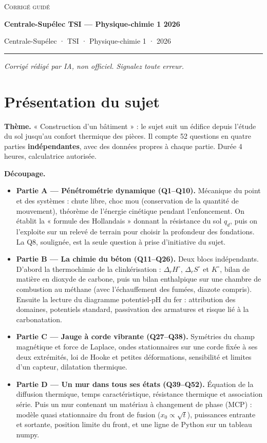 \documentclass[11pt,a4paper]{article}
\providecommand{\tightlist}{\setlength{\itemsep}{0pt}\setlength{\parskip}{0pt}}
\begin{document}
\thispagestyle{plain}
\begin{center}
  {\small\scshape Corrigé guidé}\par\smallskip
  {\LARGE\bfseries Centrale-Supélec TSI — Physique-chimie 1 2026\par}\medskip
  {\large Centrale-Supélec · TSI · Physique-chimie 1 · 2026\par}
\end{center}
\vspace{2pt}\hrule\vspace{8pt}

\emph{Corrigé rédigé par IA, non officiel. Signalez toute erreur.}

\hypertarget{pruxe9sentation-du-sujet}{%
\section{Présentation du sujet}\label{pruxe9sentation-du-sujet}}

\textbf{Thème.} « Construction d'un bâtiment » : le sujet suit un édifice depuis l'étude du sol jusqu'au confort thermique des pièces. Il compte 52 questions en quatre parties \textbf{indépendantes}, avec des données propres à chaque partie. Durée 4 heures, calculatrice autorisée.

\textbf{Découpage.}

\begin{itemize}
\tightlist
\item
  \textbf{Partie A --- Pénétrométrie dynamique (Q1--Q10).} Mécanique du point et des systèmes : chute libre, choc mou (conservation de la quantité de mouvement), théorème de l'énergie cinétique pendant l'enfoncement. On établit la « formule des Hollandais » donnant la résistance du sol \(q_d\), puis on l'exploite sur un relevé de terrain pour choisir la profondeur des fondations. La Q8, soulignée, est la seule question à prise d'initiative du sujet.
\item
  \textbf{Partie B --- La chimie du béton (Q11--Q26).} Deux blocs indépendants. D'abord la thermochimie de la clinkérisation : \(\Delta_rH^\circ\), \(\Delta_rS^\circ\) et \(K^\circ\), bilan de matière en dioxyde de carbone, puis un bilan enthalpique sur une chambre de combustion au méthane (avec l'échauffement des fumées, diazote compris). Ensuite la lecture du diagramme potentiel-pH du fer : attribution des domaines, potentiels standard, passivation des armatures et risque lié à la carbonatation.
\item
  \textbf{Partie C --- Jauge à corde vibrante (Q27--Q38).} Symétries du champ magnétique et force de Laplace, ondes stationnaires sur une corde fixée à ses deux extrémités, loi de Hooke et petites déformations, sensibilité et limites d'un capteur, dilatation thermique.
\item
  \textbf{Partie D --- Un mur dans tous ses états (Q39--Q52).} Équation de la diffusion thermique, temps caractéristique, résistance thermique et association série. Puis un mur contenant un matériau à changement de phase (MCP) : modèle quasi stationnaire du front de fusion (\(x_0 \propto \sqrt t\)), puissances entrante et sortante, position limite du front, et une ligne de Python sur un tableau numpy.
\end{itemize}
\end{document}

